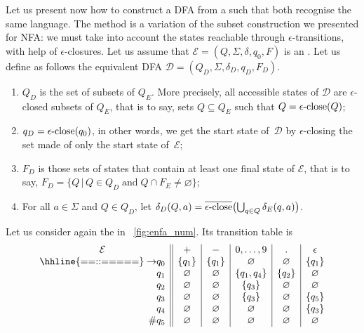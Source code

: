 Let us present now how to construct a DFA from a \eNFA such that both
recognise the same language. The method is a variation of the subset
construction we presented for NFA: we must take into account the
states reachable through \(\epsilon\)-transitions, with help of
\(\epsilon\)-closures. Let us assume that \(\mathcal{E} = (Q, \Sigma,
\delta, q_0, F)\) is an \eNFA. Let us define as follows the equivalent
DFA \(\mathcal{D} = (Q_D, \Sigma, \delta_D, q_D, F_D)\).
\begin{enumerate}

  \item \(Q_D\) is the set of subsets of \(Q_E\). More precisely, all
    accessible states of \(\mathcal{D}\) are \(\epsilon\)-closed
    subsets of \(Q_E\), that is to say, sets \(Q \subseteq Q_E\) such
    that \(Q = \epsilon\text{-close}(Q)\);

  \item \(q_D = \epsilon\text{-close} (q_0)\), in other words, we get the start
    state of~\(\mathcal{D}\) by \(\epsilon\)-closing the set made of
    only the start state of~\(\mathcal{E}\);

  \item \(F_D\) is those sets of states that contain at least one
    final state of \(\mathcal{E}\), that is to say, \(F_D = \{Q \,
    \lvert \, Q \in Q_D \; \text{and} \; Q \cap F_E \neq
    \varnothing\}\);

  \item For all \(a \in \Sigma\) and \(Q \in Q_D\), let \(\delta_D (Q,
    a) = \overline{\epsilon\text{-close}} \bigl(\bigcup_{q \in Q}{\delta_E (q,
      a)}\bigr)\).

\end{enumerate}
Let us consider again the \eNFA in \fig~\vref{fig:enfa_num}. Its
transition table is
\begin{equation*}
\begin{array}{r@{}l||c|c|c|c|c}
\multicolumn{2}{c||}{\mathcal{E}} & + & - & 0, \ldots, 9 & \mathtt{.} &
\epsilon\\
\hhline{==::=====}
\rightarrow & q_0 & \{q_1\} & \{q_1\} & \varnothing & \varnothing
                  & \{q_1\}\\
            & q_1 & \varnothing  & \varnothing & \{q_1, q_4\}
                  & \{q_2\} & \varnothing\\
            & q_2 & \varnothing  & \varnothing & \{q_3\} & \varnothing
                  & \varnothing\\
            & q_3 & \varnothing & \varnothing & \{q_3\} & \varnothing
                  & \{q_5\}\\
            & q_4 & \varnothing & \varnothing & \varnothing
                  & \varnothing & \{q_3\}\\
         \# & q_5 & \varnothing & \varnothing & \varnothing
                  & \varnothing & \varnothing
\end{array}
\end{equation*}

